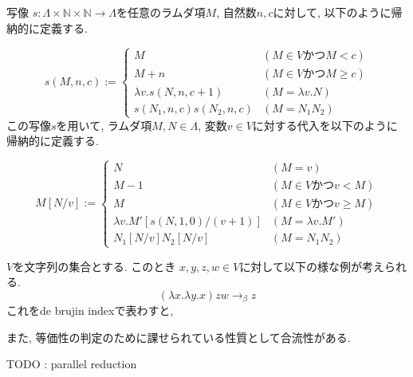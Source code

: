 \documentclass{ltjsarticle}
\begin{document}
\begin{defn}
 写像 $s \colon \Lambda \times \mathbb{N} \times \mathbb{N} \rightarrow \Lambda$を任意のラムダ項$M$, 自然数$n, c$に対して, 以下のように帰納的に定義する.
 
\[
  s (M, n, c) := \begin{cases}
    M & (M \in V \text{かつ} M < c) \\
    M + n & (M \in V \text{かつ} M \geq c) \\
    \lambda v. s (N, n, c + 1) & (M = \lambda v. N) \\
    s (N_1, n, c) s (N_2, n, c) & (M = N_1 N_2)
  \end{cases}
\]
 この写像$s$を用いて, ラムダ項$M, N \in \Lambda$, 変数$v \in V$に対する代入を以下のように帰納的に定義する.
 
\[
 M[N/v] := \begin{cases}
    N & (M = v) \\
    M - 1 & (M \in V \text{かつ} v < M) \\
    M & (M \in V \text{かつ} v \geq M) \\
    \lambda v. M' [s (N, 1, 0)/(v + 1)] & (M = \lambda v. M') \\
    N_1[N/v] N_2[N/v] & (M = N_1 N_2)
  \end{cases}
\]
\end{defn}

\begin{ex}[K コンビネータ]
 $V$を文字列の集合とする. このとき $x, y, z, w \in V$に対して以下の様な例が考えられる.
 \[
 (\lambda x. \lambda y. x) z w \rightarrow_{\beta} z
 \]
 これをde brujin indexで表わすと, 
\end{ex}

また, 等価性の判定のために課せられている性質として合流性がある.

\begin{defn}
 TODO : parallel reduction
\end{defn}
\end{document}
